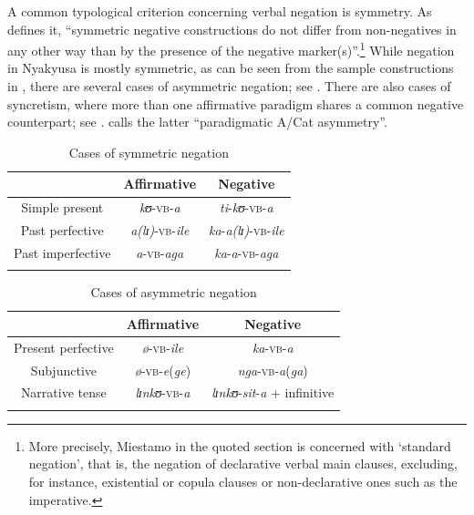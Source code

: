 A common typological criterion concerning verbal negation is symmetry. As \citet[556]{MiestamoM2007} defines it, ``symmetric negative constructions do not differ from non-negatives in any other way than by the presence of the negative marker(s)''.\footnote{More precisely, Miestamo in the quoted section is concerned with \lq standard negation', that is, the negation of declarative verbal main clauses, excluding, for instance, existential or copula clauses or non-declarative ones such as the imperative.} While negation in Nyakyusa is mostly symmetric, as can be seen from the sample constructions in , there are several cases of asymmetric negation; see . There are also cases of syncretism, where more than one affirmative paradigm shares a common negative counterpart; see . \citet{MiestamoM2005} calls the latter ``paradigmatic A/Cat asymmetry''.


\begin{table}[H]
\begin{center}
\begin{tabular}{ccc}
\lsptoprule 
& \footnotesize{Affirmative} & \footnotesize{Negative}\\ 
\midrule 
Simple present & \textit{kʊ}-\textsc{vb}-\textit{a} & \textit{ti}-\textit{kʊ}-\textsc{vb}-\textit{a}\\ 
Past perfective & \textit{a(lɪ)}-\textsc{vb}-\textit{ile} & \textit{ka}-\textit{a(lɪ)}-\textsc{vb}-\textit{ile}\\ 
Past imperfective & \textit{a}-\textsc{vb}-\textit{aga} & \textit{ka}-\textit{a}-\textsc{vb}-\textit{aga}\\ 
\lspbottomrule
\end{tabular} 
\caption{Cases of symmetric negation}
\label{tableSymmetricNegation}
\end{center}
\end{table}

\begin{table}[H]
\begin{center}
\begin{tabular}{ccc}
\lsptoprule 
& \footnotesize{Affirmative} & \footnotesize{Negative}\\ 
\midrule 
Present perfective & \textit{ø}-\textsc{vb}-\textit{ile} & \textit{ka}-\textsc{vb}-\textit{a}\\ 
Subjunctive & \textit{ø}-\textsc{vb}-\textit{e}(\textit{ge}) & \textit{nga}-\-\textsc{vb}-\textit{a}(\textit{ga})\\
Narrative tense & \textit{lɪnkʊ}-\textsc{vb}-\textit{a} & \textit{lɪnkʊ}-\textit{sit}-\textit{a} + infinitive\\
\lspbottomrule
\end{tabular} 
\caption{Cases of asymmetric negation}
\label{tableAsymmetricNegation} 
\end{center}
\end{table}

